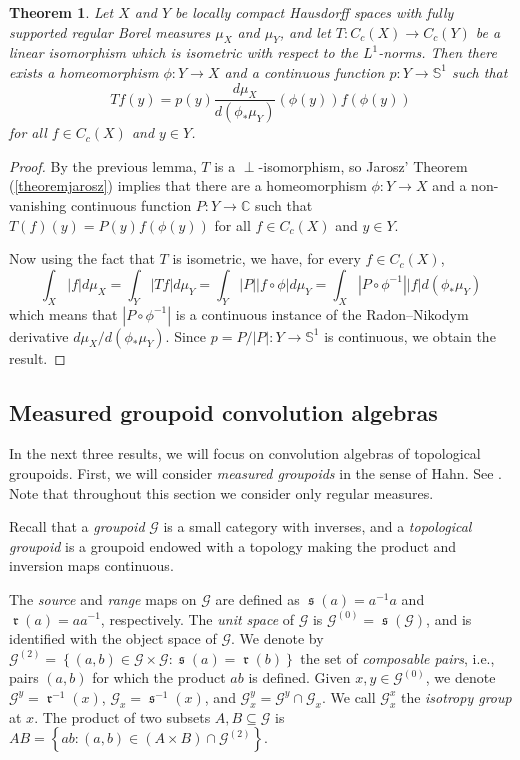 \documentclass[letter,11pt]{amsart}
\theoremstyle{plain}		\newtheorem{theorem}[generalnumbering]{Theorem}
\theoremstyle{plain}		\newtheorem{corollary}[generalnumbering]{Corollary}
\theoremstyle{definition}		\newtheorem{definition}[generalnumbering]{Definition}
\theoremstyle{definition}		\newtheorem{example}[generalnumbering]{Example}
\theoremstyle{plain}		\newtheorem{proposition}[generalnumbering]{Proposition}
\theoremstyle{plain}		\newtheorem{lemma}[generalnumbering]{Lemma}
\theoremstyle{plain}    \newtheorem{plainstyle}[generalnumbering]{\namefordifferentenvironment}
\theoremstyle{plain}    \newtheorem*{plainstyle*}{\namefordifferentenvironment}
\theoremstyle{definition}    \newtheorem{definitionstyle}[generalnumbering]{\namefordifferentenvironment}
\theoremstyle{definition}    \newtheorem*{definitionstyle*}{\namefordifferentenvironment}
\DeclareMathOperator{\so}{\mathfrak{s}}
\DeclareMathOperator{\ra}{\mathfrak{r}}
\begin{document}
\begin{theorem}\label{theoremdisjointnessl1}
	Let $X$ and $Y$ be locally compact Hausdorff spaces with fully supported regular Borel measures $\mu_X$ and $\mu_Y$, and let $T\colon C_c(X)\to C_c(Y)$ be a linear isomorphism which is isometric with respect to the $L^1$-norms. Then there exists a homeomorphism $\phi\colon Y\to X$ and a continuous function $p\colon Y\to\mathbb{S}^1$ such that
	\[Tf(y)=p(y)\frac{d\mu_X}{d(\phi_*\mu_Y)}(\phi(y))f(\phi(y))\]
	for all $f\in C_c(X)$ and $y\in Y$.
\end{theorem}
\begin{proof}
	By the previous lemma, $T$ is a $\perp$-isomorphism, so Jarosz' Theorem (\ref{theoremjarosz}) implies that there are a homeomorphism $\phi\colon Y\to X$ and a non-vanishing continuous function $P\colon Y\to\mathbb{C}$ such that $T(f)(y)=P(y)f(\phi(y))$ for all $f\in C_c(X)$ and $y\in Y$.
	
	Now using the fact that $T$ is isometric, we have, for every $f\in C_c(X)$,
	\[\int_X|f|d\mu_X=\int_Y|Tf|d\mu_Y=\int_Y|P||f\circ\phi|d\mu_Y=\int_X|P\circ\phi^{-1}||f|d(\phi_*\mu_Y)\]
	which means that $|P\circ\phi^{-1}|$ is a continuous instance of the Radon--Nikodym derivative $d\mu_X/d(\phi_*\mu_Y)$. Since $p=P/|P|\colon Y\to\mathbb{S}^1$ is continuous, we obtain the result.
\end{proof}

\subsection{Measured groupoid convolution algebras}\label{subsectionwendelstheorem}

In the next three results, we will focus on convolution algebras of topological groupoids. First, we will consider \emph{measured groupoids} in the sense of Hahn. See \cite{MR496796,MR496797,MR584266,MR1444088,MR0427598}. Note that throughout this section we consider only regular measures.

Recall that a \emph{groupoid} $\mathcal{G}$ is a small category with inverses, and a \emph{topological groupoid} is a groupoid endowed with a topology making the product and inversion maps continuous.

The \emph{source} and \emph{range} maps on $\mathcal{G}$ are defined as $\so(a)=a^{-1}a$ and $\ra(a)=aa^{-1}$, respectively. The \emph{unit space} of $\mathcal{G}$ is $\mathcal{G}^{(0)}=\so(\mathcal{G})$, and is identified with the object space of $\mathcal{G}$. We denote by $\mathcal{G}^{(2)}=\left\{(a,b)\in\mathcal{G}\times\mathcal{G}:\so(a)=\ra(b)\right\}$ the set of \emph{composable pairs}, i.e., pairs $(a,b)$ for which the product $ab$ is defined. Given $x,y\in\mathcal{G}^{(0)}$, we denote $\mathcal{G}^y=\ra^{-1}(x)$, $\mathcal{G}_x=\so^{-1}(x)$, and $\mathcal{G}_x^y=\mathcal{G}^y\cap\mathcal{G}_x$. We call $\mathcal{G}_x^x$ the \emph{isotropy group} at $x$. The product of two subsets $A,B\subseteq\mathcal{G}$ is $AB=\left\{ab:(a,b)\in(A\times B)\cap\mathcal{G}^{(2)}\right\}$.
\end{document}

